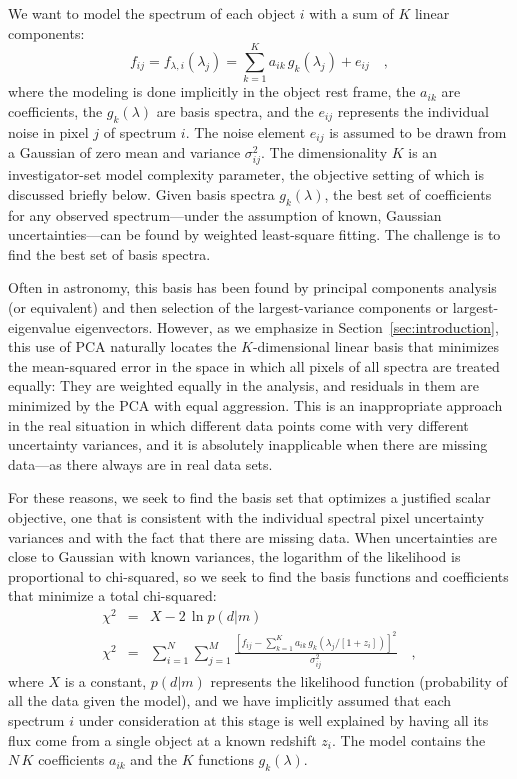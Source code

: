 \documentclass[12pt,preprint]{aastex}
\newcommand{\sectionname}{Section}
\begin{document}
We want to model the spectrum of each object $i$ with a sum of $K$
linear components:
\begin{equation}\label{eq:model}
f_{ij} = f_{\lambda,i}(\lambda_j) = \sum_{k=1}^{K} a_{ik}\,g_k(\lambda_j) + e_{ij}
\quad ,
\end{equation}
where the modeling is done implicitly in the object rest frame, the
$a_{ik}$ are coefficients, the $g_k(\lambda)$ are basis spectra, and
the $e_{ij}$ represents the individual noise in pixel $j$ of spectrum
$i$.  The noise element $e_{ij}$ is assumed to be drawn from a
Gaussian of zero mean and variance $\sigma_{ij}^2$.  The
dimensionality $K$ is an investigator-set model complexity parameter,
the objective setting of which is discussed briefly below.  Given
basis spectra $g_k(\lambda)$, the best set of coefficients for any
observed spectrum---under the assumption of known, Gaussian
uncertainties---can be found by weighted least-square fitting.  The
challenge is to find the best set of basis spectra.

Often in astronomy, this basis has been found by principal components
analysis (or equivalent) and then selection of the largest-variance
components or largest-eigenvalue eigenvectors.  However, as we
emphasize in \sectionname~\ref{sec:introduction}, this use of PCA
naturally locates the $K$-dimensional linear basis that minimizes the
mean-squared error in the space in which all pixels of all spectra are
treated equally: They are weighted equally in the analysis, and
residuals in them are minimized by the PCA with equal aggression. This
is an inappropriate approach in the real situation in which different
data points come with very different uncertainty variances, and it is
absolutely inapplicable when there are missing data---as there always
are in real data sets.

For these reasons, we seek to find the basis set that optimizes a
justified scalar objective, one that is consistent with the individual
spectral pixel uncertainty variances and with the fact that there are
missing data.  When uncertainties are close to Gaussian with known
variances, the logarithm of the likelihood is proportional to
chi-squared, so we seek to find the basis functions and coefficients
that minimize a total chi-squared:
\begin{eqnarray}\label{eq:chi-squared}\displaystyle
\chi^2 & = & X - 2\,\ln p(d|m) \nonumber\\
\chi^2 & = & \sum_{i=1}^N \sum_{j=1}^M
             \frac{\left[f_{ij}-\sum_{k=1}^K a_{ik}
                      \,g_k(\lambda_j/[1+z_i])\right]^2}
{\sigma^2_{ij}}
\quad ,
\end{eqnarray}
where $X$ is a constant, $p(d|m)$ represents the likelihood function
(probability of all the data given the model), and we have implicitly
assumed that each spectrum $i$ under consideration at this stage is
well explained by having all its flux come from a single object at a
known redshift $z_i$. The model contains the $N\,K$ coefficients
$a_{ik}$ and the $K$ functions $g_k(\lambda)$.
\end{document}
